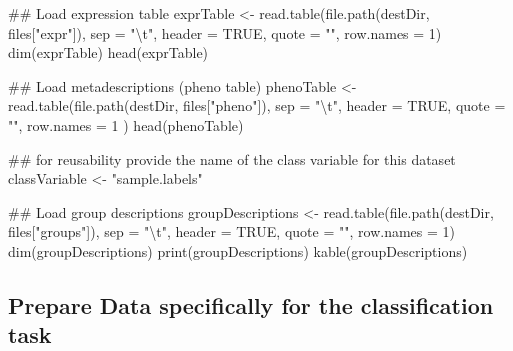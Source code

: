 \documentclass[]{article}
\newenvironment{Shaded}{\begin{snugshade}}{\end{snugshade}}
\newcommand{\CharTok}[1]{\textcolor[rgb]{0.86,0.64,0.64}{#1}}
\newcommand{\CommentTok}[1]{\textcolor[rgb]{0.50,0.62,0.50}{#1}}
\newcommand{\DataTypeTok}[1]{\textcolor[rgb]{0.87,0.87,0.75}{#1}}
\newcommand{\DecValTok}[1]{\textcolor[rgb]{0.86,0.86,0.80}{#1}}
\newcommand{\KeywordTok}[1]{\textcolor[rgb]{0.94,0.87,0.69}{#1}}
\newcommand{\NormalTok}[1]{\textcolor[rgb]{0.80,0.80,0.80}{#1}}
\newcommand{\OtherTok}[1]{\textcolor[rgb]{0.94,0.94,0.56}{#1}}
\newcommand{\StringTok}[1]{\textcolor[rgb]{0.80,0.58,0.58}{#1}}
\begin{document}
\begin{Shaded}
\begin{Highlighting}[]
\CommentTok{## Load expression table}
\NormalTok{exprTable <-}\StringTok{ }\KeywordTok{read.table}\NormalTok{(}\KeywordTok{file.path}\NormalTok{(destDir, files[}\StringTok{"expr"}\NormalTok{]),}
                        \DataTypeTok{sep =} \StringTok{"}\CharTok{\textbackslash{}t}\StringTok{"}\NormalTok{,}
                        \DataTypeTok{header =} \OtherTok{TRUE}\NormalTok{,}
                        \DataTypeTok{quote =} \StringTok{""}\NormalTok{,}
                        \DataTypeTok{row.names =} \DecValTok{1}\NormalTok{)}
\KeywordTok{dim}\NormalTok{(exprTable)}
\KeywordTok{head}\NormalTok{(exprTable)}

\CommentTok{## Load metadescriptions (pheno table)}
\NormalTok{phenoTable <-}\StringTok{ }\KeywordTok{read.table}\NormalTok{(}\KeywordTok{file.path}\NormalTok{(destDir, files[}\StringTok{"pheno"}\NormalTok{]),}
                         \DataTypeTok{sep =} \StringTok{"}\CharTok{\textbackslash{}t}\StringTok{"}\NormalTok{,}
                         \DataTypeTok{header =} \OtherTok{TRUE}\NormalTok{,}
                         \DataTypeTok{quote =} \StringTok{""}\NormalTok{,}
                         \DataTypeTok{row.names =} \DecValTok{1}
\NormalTok{                         )}
\KeywordTok{head}\NormalTok{(phenoTable)}

\CommentTok{## for reusability provide the name of the class variable for this dataset}
\NormalTok{classVariable <-}\StringTok{ "sample.labels"}

\CommentTok{## Load group descriptions}
\NormalTok{groupDescriptions <-}\StringTok{ }\KeywordTok{read.table}\NormalTok{(}\KeywordTok{file.path}\NormalTok{(destDir, files[}\StringTok{"groups"}\NormalTok{]),}
                                \DataTypeTok{sep =} \StringTok{"}\CharTok{\textbackslash{}t}\StringTok{"}\NormalTok{,}
                                \DataTypeTok{header =} \OtherTok{TRUE}\NormalTok{,}
                                \DataTypeTok{quote =} \StringTok{""}\NormalTok{,}
                                \DataTypeTok{row.names =} \DecValTok{1}\NormalTok{)}
\KeywordTok{dim}\NormalTok{(groupDescriptions)}
\KeywordTok{print}\NormalTok{(groupDescriptions)}
\KeywordTok{kable}\NormalTok{(groupDescriptions)}
\end{Highlighting}
\end{Shaded}

\hypertarget{prepare-data-specifically-for-the-classification-task}{%
\subsection{Prepare Data specifically for the classification
task}\label{prepare-data-specifically-for-the-classification-task}}
\end{document}
